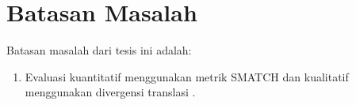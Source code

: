 \section{Batasan Masalah}

Batasan masalah dari tesis ini adalah:
\begin{enumerate}
    \item Evaluasi kuantitatif menggunakan metrik \gls{SMATCH}  dan kualitatif menggunakan divergensi translasi .
\end{enumerate}
